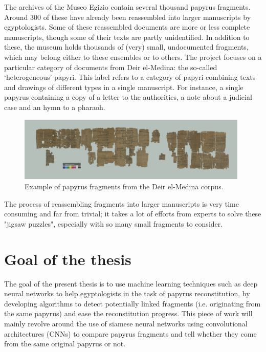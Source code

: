 \documentclass[11pt]{report}
\begin{document}
The archives of the Museo Egizio contain several thousand papyrus fragments. Around 300 of these have already been reassembled into larger manuscripts by egyptologists. Some of these reassembled documents are more or less complete manuscripts, though some of their texts are partly unidentified. In addition to these, the museum holds thousands of (very) small, undocumented fragments, which may belong either to these ensembles or to others.\newline
The project focuses on a particular category of documents from Deir el-Medina: the so-called ‘heterogeneous’ papyri. This label refers to a category of papyri combining texts and drawings of different types in a single manuscript. For instance, a single papyrus containing a copy of a letter to the authorities, a note about a judicial case and an hymn to a pharaoh.\newline

\begin{figure}[H]
\centering\includegraphics[width=11cm]{papyrus.PNG}
\caption{Example of papyrus fragments from the Deir el-Medina corpus.}
\label{papyrus}
\end{figure}

The process of reassembling fragments into larger manuscripts is very time consuming and far from trivial; it takes a lot of efforts from experts to solve these "jigsaw puzzles", especially with so many small fragments to consider.

\section{Goal of the thesis}

The goal of the present thesis is to use machine learning techniques such as deep neural networks to help egyptologists in the task of papyrus reconstitution, by developing algorithms to detect potentially linked fragments (i.e. originating from the same papyrus) and ease the reconstitution progress.\newline
This piece of work will mainly revolve around the use of siamese neural networks using convolutional architectures (CNNs) to compare papyrus fragments and tell whether they come from the same original papyrus or not.\newline
\end{document}
